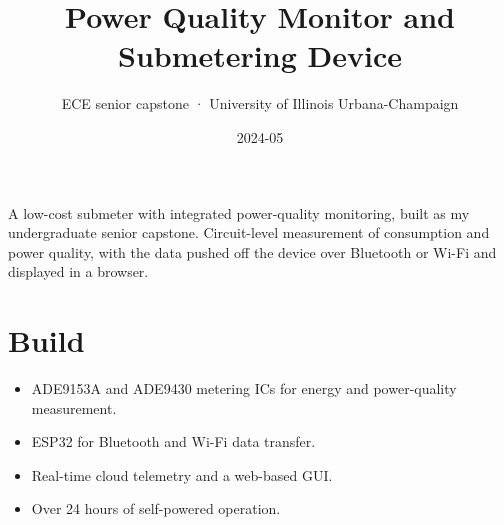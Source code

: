 \title{Power Quality Monitor and Submetering Device}
\subtitle{ECE senior capstone · University of Illinois Urbana-Champaign}
\date{2024-05}




A low-cost submeter with integrated power-quality monitoring, built as my
undergraduate senior capstone. Circuit-level measurement of consumption and
power quality, with the data pushed off the device over Bluetooth or Wi-Fi and
displayed in a browser.


\section{Build}

\begin{itemize}
  \item ADE9153A and ADE9430 metering ICs for energy and power-quality
        measurement.
  \item ESP32 for Bluetooth and Wi-Fi data transfer.
  \item Real-time cloud telemetry and a web-based GUI.
  \item Over 24 hours of self-powered operation.
\end{itemize}


